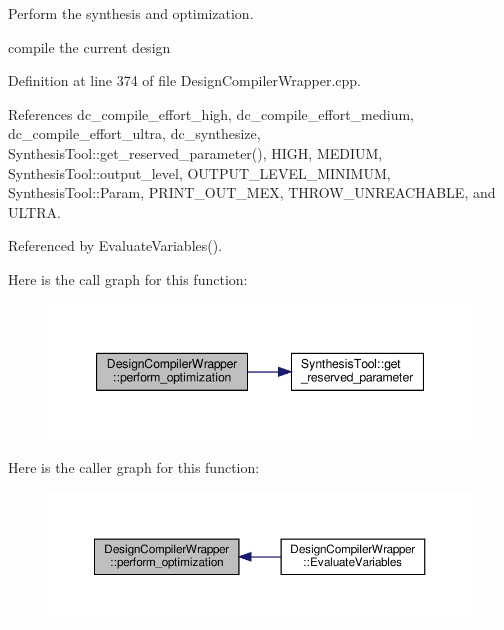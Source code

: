 Perform the synthesis and optimization. 

compile the current design 

Definition at line 374 of file Design\+Compiler\+Wrapper.\+cpp.



References dc\+\_\+compile\+\_\+effort\+\_\+high, dc\+\_\+compile\+\_\+effort\+\_\+medium, dc\+\_\+compile\+\_\+effort\+\_\+ultra, dc\+\_\+synthesize, Synthesis\+Tool\+::get\+\_\+reserved\+\_\+parameter(), H\+I\+GH, M\+E\+D\+I\+UM, Synthesis\+Tool\+::output\+\_\+level, O\+U\+T\+P\+U\+T\+\_\+\+L\+E\+V\+E\+L\+\_\+\+M\+I\+N\+I\+M\+UM, Synthesis\+Tool\+::\+Param, P\+R\+I\+N\+T\+\_\+\+O\+U\+T\+\_\+\+M\+EX, T\+H\+R\+O\+W\+\_\+\+U\+N\+R\+E\+A\+C\+H\+A\+B\+LE, and U\+L\+T\+RA.



Referenced by Evaluate\+Variables().

Here is the call graph for this function\+:
\nopagebreak
\begin{figure}[H]
\begin{center}
\leavevmode
\includegraphics[width=347pt]{d5/d55/classDesignCompilerWrapper_ab90629feb4fe9a74bb57606610561724_cgraph}
\end{center}
\end{figure}
Here is the caller graph for this function\+:
\nopagebreak
\begin{figure}[H]
\begin{center}
\leavevmode
\includegraphics[width=350pt]{d5/d55/classDesignCompilerWrapper_ab90629feb4fe9a74bb57606610561724_icgraph}
\end{center}
\end{figure}
\mbox{\label{classDesignCompilerWrapper_aa16222c84633b1ad3acfa380c4b68a9b}} 
